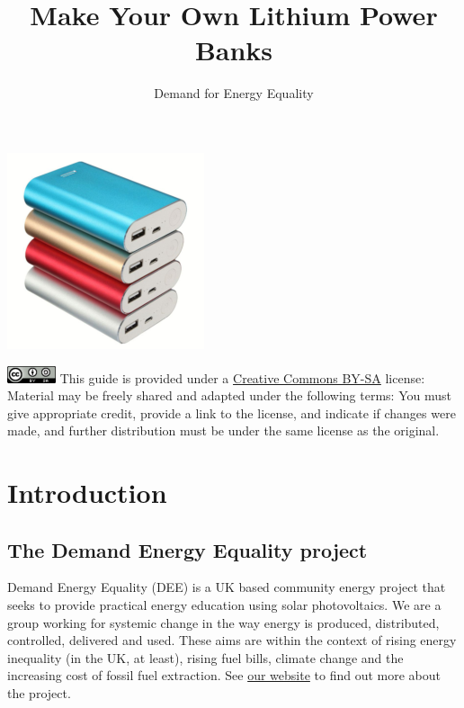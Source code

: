 \documentclass{article}
\title{Make Your Own Lithium Power Banks}
\author{Demand for Energy Equality}
\theoremstyle{definition}
\theoremstyle{definition}
\theoremstyle{remark}
\begin{document}
 
\maketitle{}

\begin{center}
  \includegraphics[]{Images/image_0_1_(power_banks).png}
\end{center}

\vfill
  
\includegraphics[]{Images/image_0_2_(license).png} \newline
This guide is provided under a \href{https://creativecommons.org/licenses/by-sa/4.0/legalcode}{Creative Commons BY-SA} license: \newline
Material may be freely shared and adapted under the following terms: You must give appropriate credit, provide a link to the license, and indicate if changes were made, and further distribution must be under the same license as the original.

\newpage

\tableofcontents

\newpage

\section{Introduction} %
\label{sec:introduction}

  \subsection{The Demand Energy Equality project} %
  \label{sub:the_demand_energy_equality_project}

    Demand Energy Equality (DEE) is a UK based community energy project that seeks to provide practical energy education using solar photovoltaics. We are a group working for systemic change in the way energy is produced, distributed, controlled, delivered and used. These aims are within the context of rising energy inequality (in the UK, at least), rising fuel bills, climate change and the increasing cost of fossil fuel extraction. See \href{https://www.demandenergyequality.org/about/}{our website} to find out more about the project.
    
\end{document}
